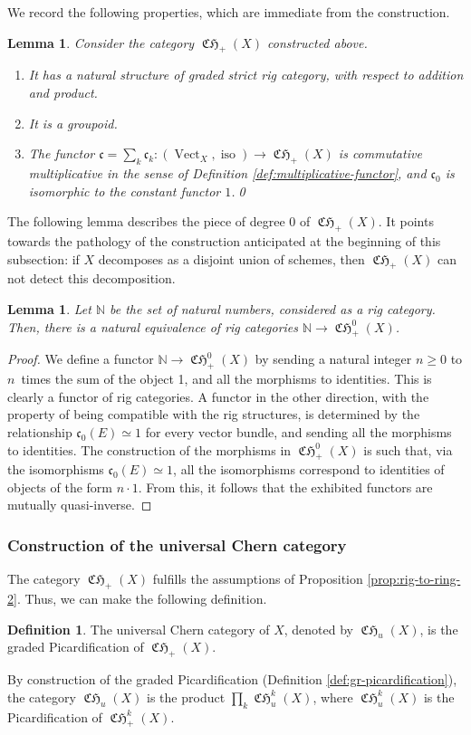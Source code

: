 \documentclass[JEP,XML,SOM,Unicode,published]{cedram}
\theoremstyle{plain}
\newtheorem{lemma}[theorem]{Lemma}
\theoremstyle{definition}
\newtheorem{definition}[theorem]{Definition}
\newcommand{\NBbb}{\mathbb N}
\newcommand{\cfrak}{\mathfrak c}
\DeclareMathOperator{\CHfrak}{\mathfrak{CH}}
\DeclareMathOperator{\iso}{iso}
\DeclareMathOperator{\Vect}{Vect}
\begin{document}
We record the following properties, which are immediate from the construction.

\begin{lemma}\label{lemma:cfrak-CHplus}
Consider the category $\CHfrak_{+}(X)$ constructed above.

\begin{enumerate}
\item It has a natural structure of graded strict rig category, with respect to addition and product.
\item It is a groupoid.
\item The functor $\cfrak=\sum_{k}\cfrak_{k}\colon (\Vect_{X},\iso)\to\CHfrak_{+}(X)$ is commutative multiplicative in the sense of Definition \ref{def:multiplicative-functor}, and $\cfrak_{0}$ is isomorphic to the constant functor $1$.\qed
\end{enumerate}
\end{lemma}

The following lemma describes the piece of degree 0 of $\CHfrak_{+}(X)$. It points towards the pathology of the construction anticipated at the beginning of this subsection: if $X$ decomposes as a disjoint union of schemes, then $\CHfrak_{+}(X)$ can not detect this decomposition.

\begin{lemma}\label{lemma:CHplus0-N}
Let $\NBbb$ be the set of natural numbers, considered as a rig category. Then, there is a natural equivalence of rig categories $\NBbb\to\CHfrak_{+}^{0}(X)$.
\end{lemma}
\begin{proof}
We define a functor $\NBbb\to\CHfrak_{+}^{0}(X)$ by sending a natural integer $n\geq 0$ to $n$~times the sum of the object 1, and all the morphisms to identities. This is clearly a functor of rig categories. A functor in the other direction, with the property of being compatible with the rig structures, is determined by the relationship $\cfrak_{0}(E)\simeq 1$ for every vector bundle, and sending all the morphisms to identities. The construction of the morphisms in $\CHfrak^{0}_{+}(X)$ is such that, via the isomorphisms $\cfrak_{0}(E)\simeq 1$, all the isomorphisms correspond to identities of objects of the form $n\cdot 1$. From this, it follows that the exhibited functors are mutually quasi-inverse.
\end{proof}

\subsubsection{Construction of the universal Chern category} The category $\CHfrak_{+}(X)$ fulfills the assumptions of Proposition \ref{prop:rig-to-ring-2}. Thus, we can make the following definition.
\begin{definition}
The universal Chern category of $X$, denoted by $\CHfrak_{u}(X)$, is the graded Picardification of $\CHfrak_{+}(X)$.
\end{definition}
By construction of the graded Picardification (\cf Definition \ref{def:gr-picardification}), the category $\CHfrak_{u}(X)$ is the product $\prod_{k}\CHfrak_{u}^{k}(X)$, where $\CHfrak_{u}^{k}(X)$ is the Picardification of $\CHfrak_{+}^{k}(X)$.
\end{document}
